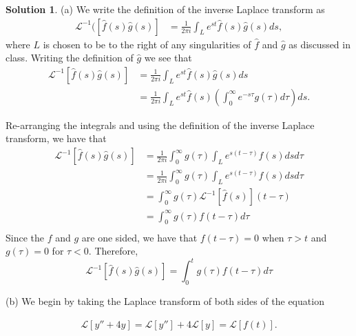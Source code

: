 \documentclass[12pt]{article}
\theoremstyle{definition}
\newtheorem{sol}{Solution}
\theoremstyle{remark}
\begin{document}
\begin{sol}\leavevmode
    (a) We write the definition of the inverse Laplace transform as 
    \begin{align*}
        \mathcal{L}^{-1}([ \hat{f}(s)\hat{g}(s)] &= \frac{1}{2\pi i} \int_{L} e^{st}   \hat{f}(s)\hat{g}(s) ds,
    \end{align*}
    where $L$ is chosen to be to the right of any singularities of $\hat{f}$ and $\hat{g}$ as discussed in class. Writing the definition of $\hat{g}$ we see that 
    \begin{align*}
        \mathcal{L}^{-1}[  \hat{f}(s)\hat{g}(s)] &= \frac{1}{2\pi i} \int_{L} e^{st}   \hat{f}(s)\hat{g}(s) ds\\
                                              &= \frac{1}{2\pi i} \int_{L} e^{st}   \hat{f}(s) \left(  \int_{0}^{\infty} e^{-s\tau } g(\tau) d\tau \right)ds.
    \end{align*}

    Re-arranging the integrals and using the definition of the inverse Laplace transform, we have that
    \begin{align*}
        \mathcal{L}^{-1}[  \hat{f}(s)\hat{g}(s)]  &= \frac{1}{2\pi i} \int_{0}^{\infty} g(\tau) \int_{L} e^{ s(t-\tau)} \hat{f}(s)ds d\tau\\
                                                  &= \frac{1}{2\pi i} \int_{0}^{\infty} g(\tau) \int_{L} e^{ s(t-\tau)} \hat{f}(s)ds d\tau\\
                                                  &= \int_{0}^{\infty} g(\tau) \mathcal{L}^{-1}[\hat{f}(s)](t-\tau)\\
                                                  &=  \int_{0}^{\infty} g(\tau) f(t-\tau) d\tau\\
    \end{align*}
    Since the $f$ and $g$ are one sided, we have that $f(t-\tau) = 0$ when $\tau > t$ and $g(\tau) = 0$ for $\tau < 0$. Therefore,
    \begin{equation*}
    \mathcal{L}^{-1}[  \hat{f}(s)\hat{g}(s)] = \int_{0}^{t} g(\tau) f(t-\tau) d\tau
    \end{equation*}

    \newpage 

    (b) We begin by taking the Laplace transform of both sides of the equation

    \begin{align*}
        \mathcal{L}[ y'' + 4y  ] = \mathcal{L}[ y'' ] +  4\mathcal{L}[y]  =\mathcal{L}[f(t)].
    \end{align*}


\end{sol}
\end{document}
